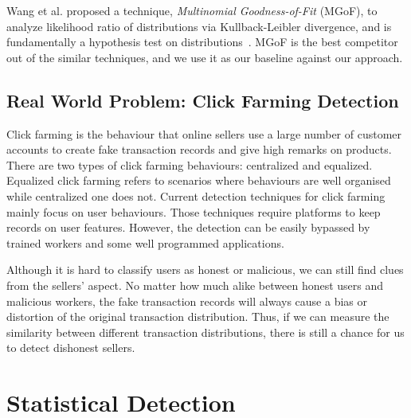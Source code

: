 \documentclass{article}
\begin{document}
			Wang et al. proposed a technique, \textit{Multinomial Goodness-of-Fit} (MGoF), to analyze likelihood ratio of distributions via Kullback-Leibler divergence, and is fundamentally a hypothesis test on distributions~\cite{wang2011statistical}.
			MGoF is the best competitor out of the similar techniques, and we use it as our baseline against our approach.
	
		\subsection{Real World Problem: Click Farming Detection}\label{sec:related-realworld}
			Click farming is the behaviour that online sellers use a large number of customer accounts to create fake transaction records and give high remarks on products.
			There are two types of click farming behaviours: centralized and equalized.
			Equalized click farming refers to scenarios where behaviours are well organised while centralized one does not.
			Current detection techniques for click farming mainly focus on user behaviours. Those techniques require platforms to keep records on user features. However, the detection can be easily bypassed by trained workers and some well programmed applications.
			
			Although it is hard to classify users as honest or malicious, we can still find clues from the sellers' aspect.
			No matter how much alike between honest users and malicious workers, the fake transaction records will always cause a bias or distortion of the original transaction distribution.
			Thus, if we can measure the similarity between different transaction distributions, there is still a chance for us to detect dishonest sellers.
	
	
	\section{Statistical Detection}\label{sec:algorithm-details}
\end{document}
